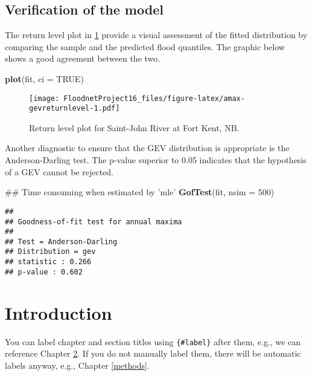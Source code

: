 \documentclass[]{book}
\newenvironment{Shaded}{\begin{snugshade}}{\end{snugshade}}
\newcommand{\DataTypeTok}[1]{\textcolor[rgb]{0.13,0.29,0.53}{#1}}
\newcommand{\DecValTok}[1]{\textcolor[rgb]{0.00,0.00,0.81}{#1}}
\newcommand{\KeywordTok}[1]{\textcolor[rgb]{0.13,0.29,0.53}{\textbf{#1}}}
\newcommand{\NormalTok}[1]{#1}
\newcommand{\OtherTok}[1]{\textcolor[rgb]{0.56,0.35,0.01}{#1}}
\theoremstyle{definition}
\theoremstyle{definition}
\theoremstyle{definition}
\theoremstyle{remark}
\begin{document}
\hypertarget{verification-of-the-model}{%
\section{Verification of the model}\label{verification-of-the-model}}

The return level plot in \ref{fig:amax-gevreturnlevel} provide a visual
assessment of the fitted distribution by comparing the sample and the
predicted flood quantiles. The graphic below shows a good agreement
between the two.

\begin{Shaded}
\begin{Highlighting}[]
\KeywordTok{plot}\NormalTok{(fit, }\DataTypeTok{ci =} \OtherTok{TRUE}\NormalTok{)}
\end{Highlighting}
\end{Shaded}

\begin{figure}
\centering
\texttt{[image: FloodnetProject16\_files/figure-latex/amax-gevreturnlevel-1.pdf]}
\caption{\label{fig:amax-gevreturnlevel}Return level plot for Saint-John
River at Fort Kent, NB.}
\end{figure}

Another diagnostic to ensure that the GEV distribution is appropriate is
the Anderson-Darling test. The p-value superior to 0.05 indicates that
the hypothesis of a GEV cannot be rejected.

\begin{Shaded}
\begin{Highlighting}[]
\NormalTok{## Time consuming when estimated by 'mle'}
\KeywordTok{GofTest}\NormalTok{(fit, }\DataTypeTok{nsim =} \DecValTok{500}\NormalTok{)}
\end{Highlighting}
\end{Shaded}

\begin{verbatim}
## 
## Goodness-of-fit test for annual maxima
##  
## Test = Anderson-Darling 
## Distribution = gev
## statistic : 0.266 
## p-value : 0.602
\end{verbatim}

\hypertarget{intro}{%
\chapter{Introduction}\label{intro}}

You can label chapter and section titles using \texttt{\{\#label\}}
after them, e.g., we can reference Chapter \ref{intro}. If you do not
manually label them, there will be automatic labels anyway, e.g.,
Chapter \ref{methods}.
\end{document}
